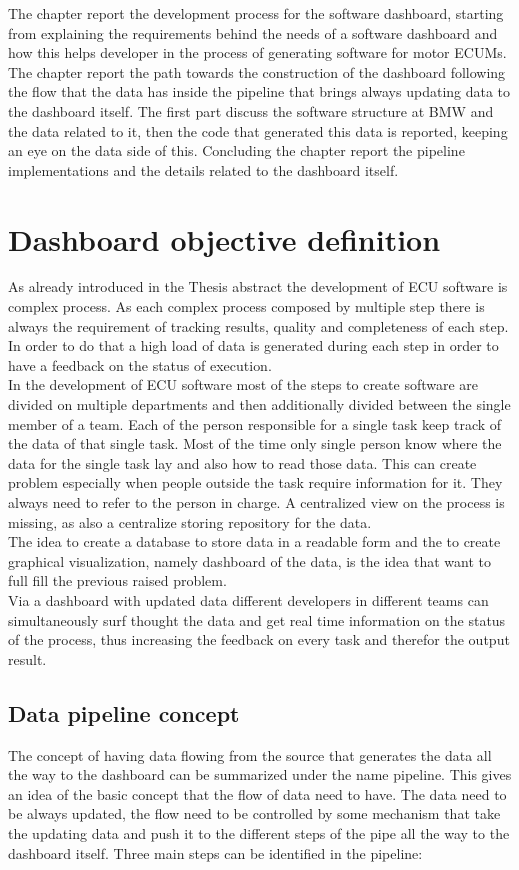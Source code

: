 \documentclass[../main.tex]{subfiles}
\begin{document}
The chapter report the development process for the software dashboard, starting from explaining the requirements behind the needs of a software dashboard and how this helps developer in the process of generating software for motor \gls{ECUM}s. The chapter report the path towards the construction of the dashboard following the flow that the data has inside the pipeline that brings always updating data to the dashboard itself. The first part discuss the software structure at \gls{BMW} and the data related to it, then the code that generated this data is reported, keeping an eye on the data side of this. Concluding the chapter report the pipeline implementations and the details related to the dashboard itself.
\section{Dashboard objective definition}
As already introduced in the Thesis abstract the development of \gls{ECU} software is complex process. As each complex process composed by multiple step there is always the requirement of tracking results, quality and completeness of each step. In order to do that a high load of data is generated during each step in order to have a feedback on the status of execution.\\
In the development of \gls{ECU} software most of the steps to create software are divided on multiple departments and then additionally divided between the single member of a team. Each of the person responsible for a single task keep track of the data of that single task. Most of the time only single person know where the data for the single task lay and also how to read those data. This can create problem especially when people outside the task require information for it. They always need to refer to the person in charge. A centralized view on the process is missing, as also a centralize storing repository for the data. \\
The idea to create a database to store data in a readable form and the to create graphical visualization, namely dashboard of the data, is the idea that want to full fill the previous raised problem.\\
Via a dashboard with updated data different developers in different teams can simultaneously surf thought the data and get real time information on the status of the process, thus increasing the feedback on every task and therefor the output result.
\subsection{Data pipeline concept}
The concept of having data flowing from the source that generates the data all the way to the dashboard can be summarized under the name pipeline. This gives an idea of the basic concept that the flow of data need to have. The data need to be always updated, the flow need to be controlled by some mechanism that take the updating data and push it to the different steps of the pipe all the way to the dashboard itself. Three main steps can be identified in the pipeline:
\end{document}
